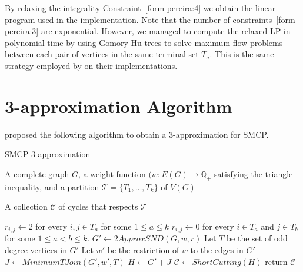 By relaxing the integrality Constraint~\eqref{form-pereira:4} we obtain the linear program used in the implementation. Note that the number of constraints~\eqref{form-pereira:3} are exponential. However, we managed to compute the relaxed LP in polynomial time by using Gomory-Hu trees to solve maximum flow problems between each pair of vertices in the same terminal set \(T_a\). This is the same strategy employed by \cite{Pereira2018TheSM} on their implementations.

\section{3-approximation Algorithm}

\cite{smcp_3apx} proposed the following algorithm to obtain a 3-approximation for SMCP.

\begin{algorithm}
\caption{SMCP 3-approximation}
\label{algorithm:smcp-3-apx}
\begin{algorithmic}[1]

\Require A complete graph \(G\), a weight function \((w: E(G) \rightarrow \mathbb{Q}_+\) satisfying the triangle inequality, and a partition \(\mathcal{T} = \{T_1, \dots, T_k\}\) of \(V(G)\)

\Ensure A collection \(\mathcal{C}\) of cycles that respects \(\mathcal{T}\)

\State \(r_{i, j} \gets 2\) for every \(i, j \in T_a\) for some \(1 \leq a \leq  k\)
\State \(r_{i, j} \gets 0\) for every \(i \in T_a\) and \(j \in T_b\) for some \(1 \leq a < b \leq k\).
\State \(G' \gets 2ApproxSND(G, w, r)\) \label{alg:3-apx:snd-2-apx}
\State Let \(T\) be the set of odd degree vertices in \(G'\)
\State Let \(w'\) be the restriction of \(w\) to the edges in \(G'\)
\State \(J \gets MinimumTJoin(G', w', T)\) \label{alg:3-apx:t-join}
\State \(H \gets G' + J\)
\State \(\mathcal{C} \gets ShortCutting(H)\) \label{alg:3-apx:shortcutting}
\State return \(\mathcal{C}\)


\end{algorithmic}
\end{algorithm}




